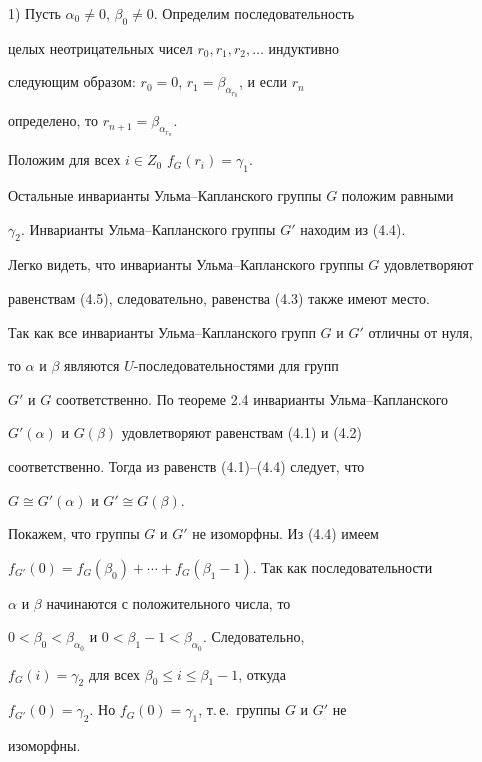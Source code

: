 \begin{pf}
1) Пусть $\alpha_0\neq 0$, $\beta_0\neq 0$. Определим последовательность


целых неотрицательных чисел $r_0, r_1, r_2, \dotsc$ индуктивно


следующим образом: $r_0=0$, $r_1=\beta_{\alpha_{r_0}}$, и если $r_n$


определено, то $r_{n+1}=\beta_{\alpha_{r_n}}$.





Положим для всех $i\in Z_0$\; $f_G(r_i)=\gamma_1$.


Остальные инварианты Ульма--Капланского группы $G$ положим равными


$\gamma_2$. Инварианты Ульма--Капланского группы $G'$ находим из (4.4).


Легко видеть, что инварианты Ульма--Капланского группы $G$ удовлетворяют


равенствам (4.5), следовательно, равенства (4.3) также имеют место.





Так как все инварианты Ульма--Капланского групп $G$ и $G'$ отличны от нуля,


то $\alpha$ и $\beta$ являются $U$-последовательностями для групп


$G'$ и $G$ соответственно. По теореме 2.4 инварианты Ульма--Капланского


$G'(\alpha)$ и $G(\beta)$ удовлетворяют равенствам (4.1) и (4.2)


соответственно. Тогда из равенств (4.1)--(4.4) следует, что


$G\cong G'(\alpha)$ и $G'\cong G(\beta)$.





Покажем, что группы $G$ и $G'$ не изоморфны. Из (4.4) имеем


$f_{G'}(0)=f_G(\beta_0)+\dotsb+f_G(\beta_1-1)$. Так как последовательности


$\alpha$ и $\beta$ начинаются с положительного числа, то


$0<\beta_0<\beta_{\alpha_0}$ и $0<\beta_1-1<\beta_{\alpha_0}$. Следовательно,


$f_G(i)=\gamma_2$ для всех $\beta_0\leq i\leq\beta_1-1$, откуда


$f_{G'}(0)=\gamma_2$. Но $f_G(0)=\gamma_1$, т.\,е.\ группы $G$ и $G'$ не


изоморфны.






\end{pf}
